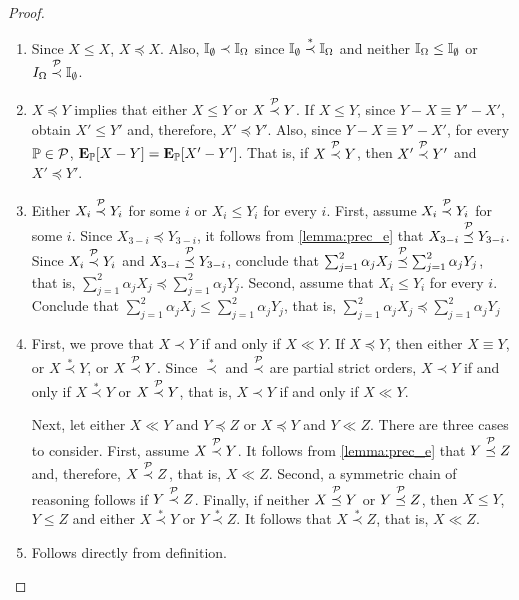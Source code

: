 \begin{proof}
 \begin{enumerate}[leftmargin=*]
  \item Since $X \leq X$, $X \preceq X$.
  Also, ${\mathbb I}_{\emptyset} \prec {\mathbb I}_{\Omega}$ since 
  ${\mathbb I}_{\emptyset} \stackrel{*}{\prec} {\mathbb I}_{\Omega}$ and
  neither ${\mathbb I}_{\Omega} \leq {\mathbb I}_{\emptyset}$ or
  $I_{\Omega} \stackrel{\mathcal{P}}{\prec} {\mathbb I}_{\emptyset}$.
  
  \item $X \preceq Y$ implies that either 
  $X \leq Y$ or $X \stackrel{\mathcal{P}}{\prec} Y$.
  If $X \leq Y$, since $Y-X \equiv Y'-X'$, 
  obtain $X' \leq Y'$ and, therefore, 
  $X' \preceq Y'$. Also,
  since $Y-X \equiv Y'-X'$, for every ${\mathbb P} \in \mathcal{P}$,
  ${\textbf{E}}_{{\mathbb P}}[X-Y] = {\textbf{E}}_{{\mathbb P}}[X'-Y']$. That is,
  if $X \stackrel{\mathcal{P}}{\prec} Y$, then 
  $X' \stackrel{\mathcal{P}}{\prec} Y'$ and $X' \preceq Y'$.
  
  \item 
  Either $X_i \stackrel{\mathcal{P}}{\prec} Y_i$ for some $i$ or
  $X_i \leq Y_i$ for every $i$.
  First, assume $X_i \stackrel{\mathcal{P}}{\prec} Y_i$ for some $i$.
  Since $X_{3-i} \preceq Y_{3-i}$, it follows from
  \cref{lemma:prec_e} that 
  $X_{3-i} \stackrel{\mathcal{P}}{\preceq} Y_{3-i}$.
  Since $X_i \stackrel{\mathcal{P}}{\prec} Y_i$ and
  $X_{3-i} \stackrel{\mathcal{P}}{\preceq} Y_{3-i}$, conclude that
  $\sum_{j=1}^2 \alpha_j X_j \stackrel{\mathcal{P}}{\preceq}
  \sum_{j=1}^2 \alpha_j Y_j$, that is,
  $\sum_{j=1}^2 \alpha_j X_j \preceq
  \sum_{j=1}^2 \alpha_j Y_j$.
  Second, assume that $X_i \leq Y_i$ for every $i$. Conclude that
  $\sum_{j=1}^2 \alpha_j X_j \leq
  \sum_{j=1}^2 \alpha_j Y_j$, that is,
  $\sum_{j=1}^2 \alpha_j X_j \preceq
  \sum_{j=1}^2 \alpha_j Y_j$
  
  \item 
  First, we prove that $X \prec Y$ if and only if $X \ll Y$.
  If $X \preceq Y$, then either 
  $X \equiv Y$, or $X \stackrel{*}{\prec} Y$, 
  or $X \stackrel{\mathcal{P}}{\prec} Y$. Since
  $\stackrel{*}{\prec}$ and $\stackrel{\mathcal{P}}{\prec}$ are
  partial strict orders,
  $X \prec Y$ if and only if 
  $X \stackrel{*}{\prec} Y$ or
  $X \stackrel{\mathcal{P}}{\prec} Y$, that is,
  $X \prec Y$ if and only if $X \ll Y$.
  
  Next, let either $X \ll Y$ and $Y \preceq Z$ or
  $X \preceq Y$ and $Y \ll Z$.
  There are three cases to consider.
  First, assume $X \stackrel{\mathcal{P}}{\prec} Y$.
  It follows from \cref{lemma:prec_e} that
  $Y \stackrel{\mathcal{P}}{\preceq} Z$ and, therefore,
  $X \stackrel{\mathcal{P}}{\prec} Z$, that is,
  $X \ll Z$. Second, a symmetric chain of reasoning
  follows if  $Y \stackrel{\mathcal{P}}{\prec} Z$.
  Finally, if neither $X \stackrel{\mathcal{P}}{\preceq} Y$ or
  $Y \stackrel{\mathcal{P}}{\preceq} Z$, then
  $X \leq Y$, $Y \leq Z$ and either 
  $X \stackrel{*}{\prec} Y$ or
  $Y \stackrel{*}{\prec} Z$. It follows that
  $X \stackrel{*}{\prec} Z$, that is,
  $X \ll Z$.
  
  \item Follows directly from definition.
 \end{enumerate}
\end{proof}

